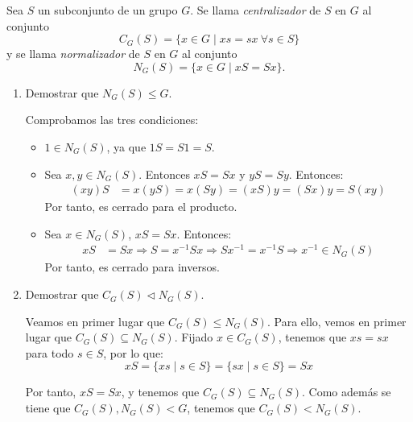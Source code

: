 \begin{ejercicio}
    Sea $S$ un subconjunto de un grupo $G$. Se llama \emph{centralizador} de $S$ en $G$ al conjunto
    \[
        C_G(S) = \{x\in G\mid xs=sx\ \forall s\in S\}
    \]
    y se llama \emph{normalizador} de $S$ en $G$ al conjunto
    \[
        N_G(S) = \{x\in G\mid xS=Sx\}.
    \]
    \begin{enumerate}
        \item Demostrar que $N_G(S)\leq G$.
        
        Comprobamos las tres condiciones:
        \begin{itemize}
            \item $1\in N_G(S)$, ya que $1S=S1=S$.
            \item Sea $x,y\in N_G(S)$. Entonces $xS=Sx$ y $yS=Sy$. Entonces:
                \begin{align*}
                    (xy)S &= x(yS) = x(Sy) = (xS)y = (Sx)y = S(xy)
                \end{align*}
                Por tanto, es cerrado para el producto.
            \item Sea $x\in N_G(S)$, $xS=Sx$. Entonces:
                \begin{align*}
                    xS &= Sx \Longrightarrow S = x^{-1}Sx \Longrightarrow Sx^{-1} = x^{-1}S \Longrightarrow x^{-1}\in N_G(S)
                \end{align*}
                Por tanto, es cerrado para inversos.
        \end{itemize}
        \item Demostrar que $C_G(S)\lhd N_G(S)$.
        
        Veamos en primer lugar que $C_G(S)\leq N_G(S)$. Para ello, vemos en primer lugar que $C_G(S)\subseteq N_G(S)$. Fijado $x\in C_G(S)$, tenemos que $xs=sx$ para todo $s\in S$, por lo que:
        \begin{equation*}
            xS = \{xs\mid s\in S\} = \{sx\mid s\in S\} = Sx
        \end{equation*}

        Por tanto, $xS=Sx$, y tenemos que $C_G(S)\subseteq N_G(S)$. Como además se tiene que $C_G(S),N_G(S)<G$, tenemos que $C_G(S)<N_G(S)$.
        

\end{enumerate}
\end{ejercicio}
